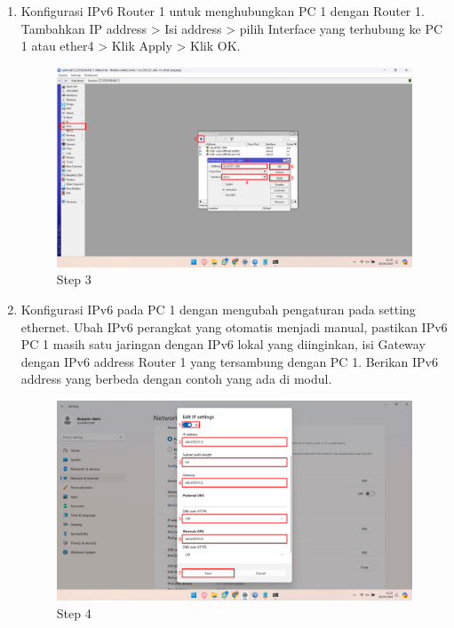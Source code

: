 \begin{center}
\begin{enumerate}
        \item Konfigurasi IPv6 Router 1 untuk menghubungkan PC 1 dengan Router 1. Tambahkan IP address > Isi address > pilih Interface yang terhubung ke PC 1 atau ether4 > Klik Apply > Klik OK.
        \begin{figure}[H]
			\centering
			\includegraphics[width=0.8\linewidth]{P5/img/pc1/Step 3.png}
			\caption{Step 3}
			\label{fig:Step 3(PC 1)}
		\end{figure}

        \item Konfigurasi IPv6 pada PC 1 dengan mengubah pengaturan pada setting ethernet. Ubah IPv6 perangkat yang otomatis menjadi manual, pastikan IPv6 PC 1 masih satu jaringan dengan IPv6 lokal yang diinginkan, isi Gateway dengan IPv6 address Router 1 yang tersambung dengan PC 1. Berikan IPv6 address yang berbeda dengan contoh yang ada di modul.
        \begin{figure}[H]
			\centering
			\includegraphics[width=0.8\linewidth]{P5/img/pc1/Step 4.png}
			\caption{Step 4}
			\label{fig:Step 4(PC 1)}
		\end{figure}


\end{enumerate}
\end{center}
